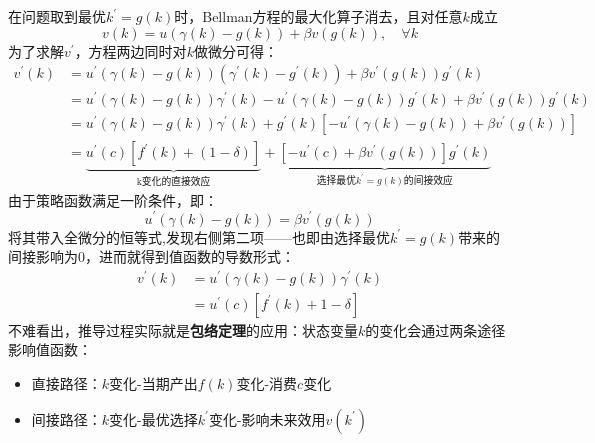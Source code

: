 在问题取到最优$k^{\prime}=g\left(k\right)$时，Bellman方程的最大化算子消去，且对任意$k$成立
\begin{equation*}
    v\left(k\right)=u\left(\gamma\left(k\right)-g\left(k\right)\right)+\beta v\left(g\left(k\right)\right),\quad \forall k
\end{equation*}
为了求解$v^{\prime}$，方程两边同时对$k$做微分可得：
\begin{equation}
    \begin{aligned}
    v^{\prime}\left(k\right) 
    &= u^{\prime}\left(\gamma\left(k\right)-g\left(k\right)\right)
            \left(\gamma^{\prime}\left(k\right)-g^{\prime}\left(k\right)\right)
            + \beta v^{\prime}\left(g\left(k\right)\right)g^{\prime}\left(k\right) \\
    &= u^{\prime}\left(\gamma\left(k\right)-g\left(k\right)\right)\gamma^{\prime}\left(k\right) 
            -u^{\prime}\left(\gamma\left(k\right)-g\left(k\right)\right)g^{\prime}\left(k\right) 
            + \beta v^{\prime}\left(g\left(k\right)\right)g^{\prime}\left(k\right) \\
    & = u^{\prime}\left(\gamma\left(k\right)-g\left(k\right)\right)\gamma^{\prime}\left(k\right)
            +g^{\prime}\left(k\right)\left[-u^{\prime}\left(\gamma\left(k\right)-g\left(k\right)\right)
            +\beta v^{\prime}\left(g\left(k\right)\right)\right] \\
    &= \underbrace{u^{\prime}\left(c\right)\left[f^{\prime}\left(k\right)+\left(1-\delta\right)\right]}_{\text{k变化的直接效应}}
            + \underbrace{\left[-u^{\prime}\left(c\right)+\beta v^{\prime}\left(g\left(k\right)\right)\right]
                g^{\prime}\left(k\right)}_{\text{选择最优$k^{\prime}=g\left(k\right)$的间接效应}}
    \end{aligned}
\end{equation}
由于策略函数满足一阶条件，即：
\begin{equation*}
    u^{\prime}\left(\gamma\left(k\right)-g\left(k\right)\right)=\beta v^{\prime}\left(g\left(k\right)\right)
\end{equation*}
将其带入全微分的恒等式,发现右侧第二项——也即由选择最优$k^{\prime}=g(k)$带来的间接影响为0，进而就得到值函数的导数形式：
\begin{align}
    v^{\prime}\left(k\right) &= u^{\prime}\left(\gamma\left(k\right)-g\left(k\right)\right)\gamma^{\prime}\left(k\right) \nonumber \\
        &= u^{\prime}\left(c\right)\left[f^{\prime}\left(k\right)+1-\delta\right] \label{bs}
\end{align}
不难看出，推导过程实际就是\textbf{包络定理}的应用：状态变量$k$的变化会通过两条途径影响值函数：
\begin{itemize}
    \item 直接路径：$k$变化-当期产出$f\left(k\right)$变化-消费$c$变化
    \item 间接路径：$k$变化-最优选择$k^{\prime}$变化-影响未来效用$v\left(k^{\prime}\right)$
\end{itemize}

